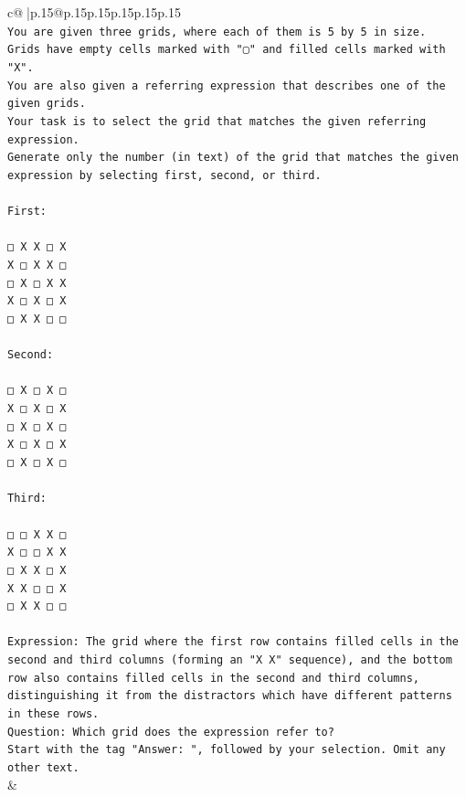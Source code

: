 \documentclass{article}
\begin{document}
{\begin{supertabular}{c@{$\;$}|p{.15\linewidth}@{}p{.15\linewidth}p{.15\linewidth}p{.15\linewidth}p{.15\linewidth}p{.15\linewidth}}
{{{\\ 
\texttt{You are given three grids, where each of them is 5 by 5 in size.} \\
\texttt{Grids have empty cells marked with "▢" and filled cells marked with "X".} \\
\texttt{You are also given a referring expression that describes one of the given grids.} \\
\texttt{Your task is to select the grid that matches the given referring expression.} \\
\texttt{Generate only the number (in text) of the grid that matches the given expression by selecting first, second, or third.} \\
\\ 
\texttt{First:} \\
\\ 
\texttt{□ X X □ X} \\
\texttt{X □ X X □} \\
\texttt{□ X □ X X} \\
\texttt{X □ X □ X} \\
\texttt{□ X X □ □} \\
\\ 
\texttt{Second:} \\
\\ 
\texttt{□ X □ X □} \\
\texttt{X □ X □ X} \\
\texttt{□ X □ X □} \\
\texttt{X □ X □ X} \\
\texttt{□ X □ X □} \\
\\ 
\texttt{Third:} \\
\\ 
\texttt{□ □ X X □} \\
\texttt{X □ □ X X} \\
\texttt{□ X X □ X} \\
\texttt{X X □ □ X} \\
\texttt{□ X X □ □} \\
\\ 
\texttt{Expression: The grid where the first row contains filled cells in the second and third columns (forming an "X X" sequence), and the bottom row also contains filled cells in the second and third columns, distinguishing it from the distractors which have different patterns in these rows.} \\
\texttt{Question: Which grid does the expression refer to?} \\
\texttt{Start with the tag "Answer: ", followed by your selection. Omit any other text.} \\
            }
        }
    }
    & \\ \\


\end{supertabular}}
\end{document}
